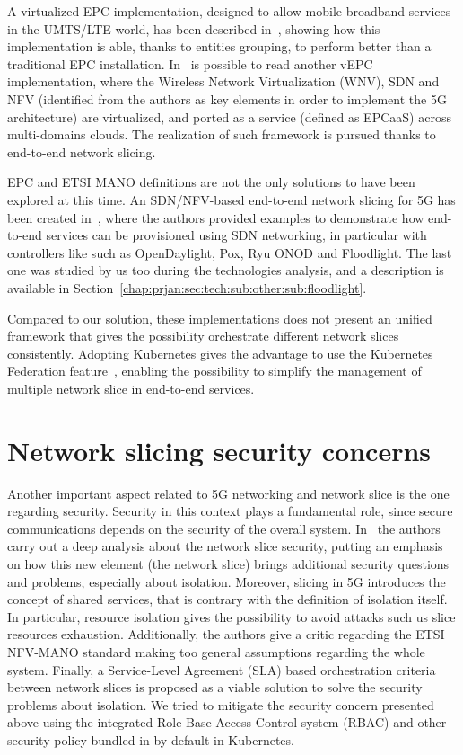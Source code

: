 A virtualized EPC implementation, designed to allow mobile broadband services in
the UMTS/LTE world, has been described in~\cite{hawilo2014nfv}, showing how this
implementation is able, thanks to entities grouping, to perform better than a
traditional EPC installation. In~\cite{afolabi2017end} is possible to read
another vEPC implementation, where the Wireless Network Virtualization (WNV),
SDN and NFV (identified from the authors as key elements in order to implement
the 5G architecture) are virtualized, and ported as a service (defined as
EPCaaS) across multi-domains clouds. The realization of such framework is
pursued thanks to end-to-end network slicing.

EPC and ETSI MANO definitions are not the only solutions to have been explored
at this time. An SDN/NFV-based end-to-end network slicing for 5G has been
created in~\cite{chartsias2017sdn}, where the authors provided examples to
demonstrate how end-to-end services can be provisioned using SDN networking, in
particular with controllers like such as OpenDaylight, Pox, Ryu ONOD and
Floodlight. The last one was studied by us too during the technologies analysis,
and a description is available in
Section~\ref{chap:prjan:sec:tech:sub:other:sub:floodlight}.

Compared to our solution, these implementations does not present an unified
framework that gives the possibility orchestrate different network slices
consistently. Adopting Kubernetes gives the advantage to use the Kubernetes
Federation feature~\cite{kubeFederation}, enabling the possibility to simplify
the management of multiple network slice in end-to-end services.

\section{Network slicing security concerns}

Another important aspect related to 5G networking and network slice is the one
regarding security. Security in this context plays a fundamental role, since
secure communications depends on the security of the overall system.
In~\cite{kotulski2017end} the authors carry out a deep analysis about the
network slice security, putting an emphasis on how this new element (the network
slice) brings additional security questions and problems, especially about
isolation. Moreover, slicing in 5G introduces the concept of shared services,
that is contrary with the definition of isolation itself. In particular,
resource isolation gives the possibility to avoid attacks such us slice
resources exhaustion. Additionally, the authors give a critic regarding the ETSI
NFV-MANO standard making too general assumptions regarding the whole system.
Finally, a Service-Level Agreement (SLA) based orchestration criteria between
network slices is proposed as a viable solution to solve the security problems
about isolation. We tried to mitigate the security concern presented above using
the integrated Role Base Access Control system (RBAC) and other security policy
bundled in by default in Kubernetes.

